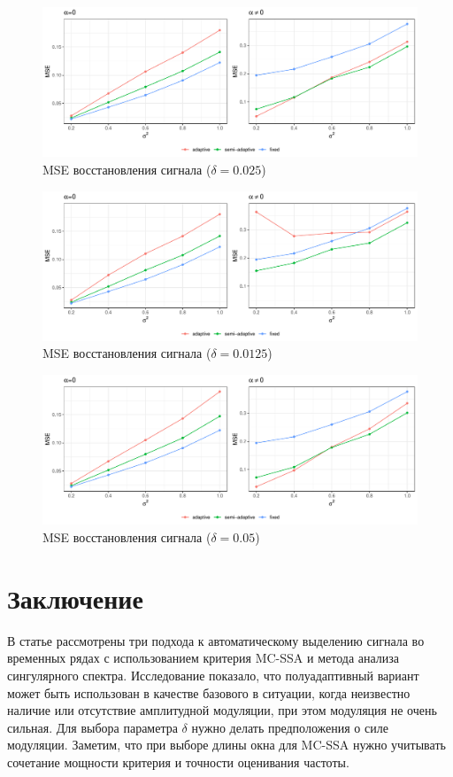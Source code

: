 \documentclass{math-mech-sci}
\begin{document}
\begin{figure}[h!]
    \centering
    \includegraphics[width=\linewidth]{img/mse.pdf}
    \caption{MSE восстановления сигнала ($\delta=0.025$)}
    \label{fig:mse1}
\end{figure}
\begin{figure}[h!]
    \centering
    \includegraphics[width=\linewidth]{img/mse_delta_smaller.pdf}
    \caption{MSE восстановления сигнала ($\delta=0.0125$)}
    \label{fig:mse2}
\end{figure}
\begin{figure}[h!]
    \centering
    \includegraphics[width=\linewidth]{img/mse_delta_bigger.pdf}
    \caption{MSE восстановления сигнала ($\delta=0.05$)}
    \label{fig:mse3}
\end{figure}

\section*{Заключение}
В статье рассмотрены три подхода к автоматическому выделению сигнала во временных рядах с использованием критерия MC-SSA и метода анализа сингулярного спектра. Исследование показало, что полуадаптивный вариант может быть использован в качестве базового в ситуации, когда неизвестно наличие или отсутствие амплитудной модуляции, при этом модуляция не очень сильная. Для выбора параметра $\delta$ нужно делать предположения о силе модуляции. Заметим, что при выборе длины окна для MC-SSA нужно учитывать сочетание мощности критерия  и точности оценивания частоты.
\end{document}

